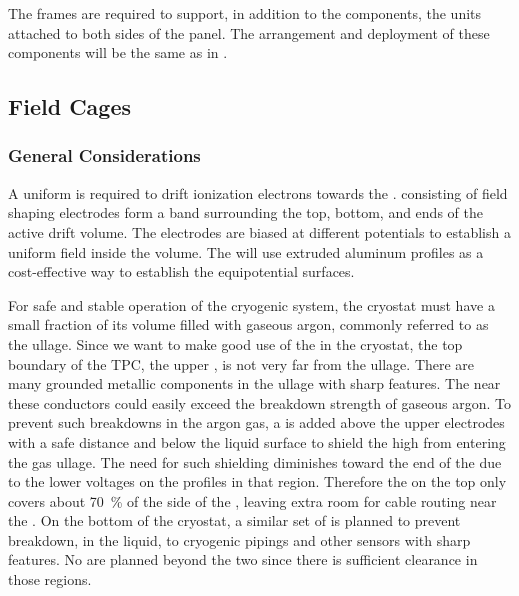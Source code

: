 The  frames are required to support, in addition to the  components, the  units attached to both sides of the  panel. The arrangement and deployment of these components will be the same as in .  
\subsection{Field Cages}
\subsubsection{General Considerations}

A uniform \efield{} is required to drift ionization electrons towards the .  consisting of field shaping electrodes form a band surrounding the top, bottom, and ends of the active drift volume. The electrodes are biased at different potentials to establish a uniform field inside the  volume.
The  will use extruded aluminum profiles as a cost-effective way to establish the equipotential surfaces. 

For safe and stable operation of the \lar cryogenic system, the cryostat must have a small fraction of its volume filled with gaseous argon, commonly referred to as the ullage. Since we want to make good use of the \lar in the cryostat, the top boundary of the TPC, the upper , is not very far from the ullage. There are many grounded metallic components in the ullage with sharp features.  The \efield near these conductors could easily exceed the breakdown strength of gaseous argon. To prevent such breakdowns in the argon gas, a  is added above the upper  electrodes with a safe distance and below the liquid surface to shield the high \efield from entering the gas ullage.  The need for such shielding diminishes toward the  end of the  due to the lower voltages on the  profiles in that region. Therefore the  on the top only covers about \SI{70}{\%} of the  side of the , leaving extra room for cable routing near the .
On the bottom of the cryostat, a similar set of  is planned to prevent breakdown, in the liquid, to cryogenic pipings and other sensors with sharp features.  No  are planned beyond the two  since there is sufficient clearance in those regions.  

